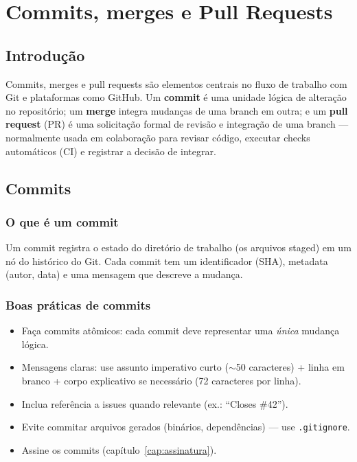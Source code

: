 \chapter{Commits, merges e Pull Requests}
\label{cap:commits}

\section{Introdução}
Commits, merges e pull requests são elementos centrais no fluxo de trabalho com Git e plataformas como GitHub.  
Um \textbf{commit} é uma unidade lógica de alteração no repositório; um \textbf{merge} integra mudanças de uma branch em outra; e um \textbf{pull request} (PR) é uma solicitação formal de revisão e integração de uma branch — normalmente usada em colaboração para revisar código, executar checks automáticos (CI) e registrar a decisão de integrar.

\section{Commits}

\subsection{O que é um commit}
Um commit registra o estado do diretório de trabalho (os arquivos staged) em um nó do histórico do Git. Cada commit tem um identificador (SHA), metadata (autor, data) e uma mensagem que descreve a mudança.

\subsection{Boas práticas de commits}
\begin{itemize}
  \item Faça commits atômicos: cada commit deve representar uma \emph{única} mudança lógica.  
  \item Mensagens claras: use assunto imperativo curto (\(\sim\)50 caracteres) + linha em branco + corpo explicativo se necessário (72 caracteres por linha).  
  \item Inclua referência a issues quando relevante (ex.: ``Closes \#42'').  
  \item Evite commitar arquivos gerados (binários, dependências) — use \texttt{.gitignore}.  
  \item Assine os commits (capítulo~\ref{cap:assinatura}).
\end{itemize}

